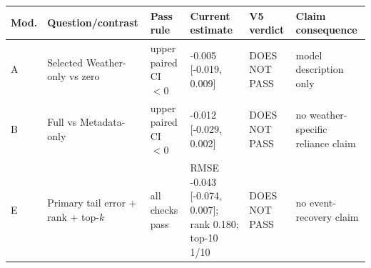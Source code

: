 \begin{tabular}{p{}p{}p{}p{}p{}p{}}
\toprule
Mod. & Question/contrast & Pass rule & Current estimate & V5 verdict & Claim consequence \\
\midrule
A & Selected Weather-only vs zero & upper paired CI $<0$ & -0.005 [-0.019, 0.009] & DOES NOT PASS & model description only \\
B & Full vs Metadata-only & upper paired CI $<0$ & -0.012 [-0.029, 0.002] & DOES NOT PASS & no weather-specific reliance claim \\
E & Primary tail error + rank + top-$k$ & all checks pass & RMSE -0.043 [-0.074, 0.007]; rank 0.180; top-10 1/10 & DOES NOT PASS & no event-recovery claim \\
\bottomrule
\end{tabular}

